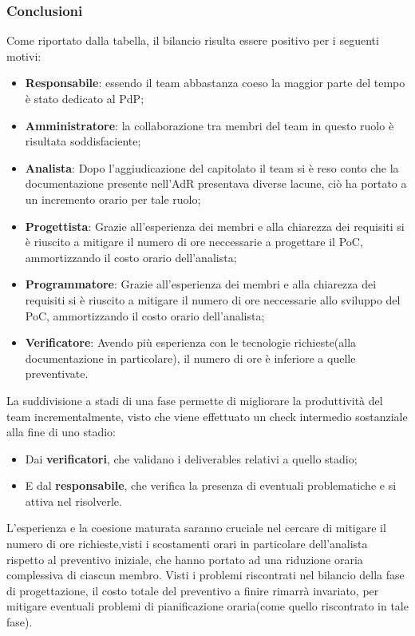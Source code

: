 \subsubsection{Conclusioni}
Come riportato dalla tabella, il bilancio risulta essere positivo per i seguenti motivi:
\begin{itemize}
	\item \textbf{Responsabile}: {essendo il team abbastanza coeso la maggior parte del tempo è stato dedicato al PdP;}
	\item \textbf{Amministratore}: {la collaborazione tra membri del team in questo ruolo è risultata soddisfaciente;}
	\item \textbf{Analista}: {Dopo l'aggiudicazione del capitolato il team si è reso conto che la documentazione presente nell'AdR presentava diverse lacune, ciò ha portato a un incremento orario per tale ruolo;}
	\item \textbf{Progettista}: {Grazie all'esperienza dei membri e alla chiarezza dei requisiti si è riuscito a mitigare il numero di ore neccessarie a progettare il PoC, ammortizzando il costo orario dell'analista;}
	\item \textbf{Programmatore}: {Grazie all'esperienza dei membri e alla chiarezza dei requisiti si è riuscito a mitigare il numero di ore neccessarie allo sviluppo del PoC, ammortizzando il costo orario dell'analista;}
	\item \textbf{Verificatore}: {Avendo più esperienza con le tecnologie richieste(alla documentazione in particolare), il numero di ore è inferiore a quelle preventivate.}
\end{itemize}
La suddivisione a stadi di una fase permette di migliorare la produttività del team incrementalmente, visto che viene effettuato un check intermedio sostanziale alla fine di uno stadio:
\begin{itemize}
	\item Dai \textbf{verificatori}, che validano i deliverables relativi a quello stadio;
	\item E dal \textbf{responsabile}, che verifica la presenza di eventuali problematiche e si attiva nel risolverle.
\end{itemize}
L'esperienza e la coesione maturata saranno cruciale nel cercare di mitigare il numero di ore richieste,visti i scostamenti orari in particolare dell'analista rispetto al preventivo iniziale, che hanno portato ad una riduzione oraria complessiva di ciascun membro.
Visti i problemi riscontrati nel bilancio della fase di progettazione, il costo totale del preventivo a finire rimarrà invariato, per mitigare eventuali problemi di pianificazione oraria(come quello riscontrato in tale fase).
